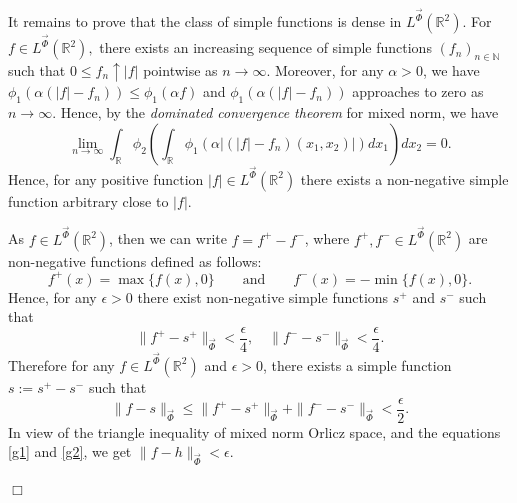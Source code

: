 \documentclass[11pt, a4paper]{article}
\theoremstyle{definition}
\newcommand{\qedwhite}{\hfill \ensuremath{\Box}}
\renewenvironment{proof}{{\raggedright \bfseries Proof.}}{\qedwhite}
\numberwithin{equation}{section}
\def\NN{\mathbb N}
\def\RR{\mathbb R}
\newcommand{\dlp}[1]{{\color{red}{[DP: #1]}}}
\newcommand{\vc}[1]{\overrightarrow{#1}}
\begin{document}
\begin{proof}
    
 It remains to prove that the class of simple functions is dense in $L^{\overrightarrow{\Phi}}(\mathbb{R}^2)$. For $f\in L^{\overrightarrow{\Phi}}(\RR^2),$ there exists an increasing sequence of simple functions $(f_n)_{n \in \NN}$   such that $0\leq f_n \uparrow |f|$ pointwise  as $n \rightarrow \infty$.  Moreover, for any $\alpha>0$, we have $\phi_1(\alpha(|f|-f_n))\leq \phi_1(\alpha f)$ and $\phi_1(\alpha(|f|-f_n))$ approaches to zero as $n \rightarrow \infty.$ Hence, by the \emph{dominated convergence theorem} for mixed norm, we have
 $$ \lim_{n\to \infty} \int _{\RR}\phi_2\left(\int_{\RR}\phi_1\left( \alpha|(|f|-f_n)(x_1,x_2)| \right)dx_1\right)dx_2 = 0.$$ Hence, for any positive function $|f|\in L^{\vc{\Phi}}(\RR^2)$ there exists a non-negative simple function arbitrary close to $|f|$.
\par 
As $f\in L^{\vc{\Phi}}(\RR^2)$, then we can write \( f = f^+ - f^- \), where \( f^+, f^- \in L^{\overrightarrow{\Phi}}(\mathbb{R}^2) \) are non-negative functions defined as follows:
\begin{equation*}
    f^+(x)=\max\{f(x), 0\} \qquad \text{and} \qquad f^-(x)=-\min\{f(x), 0\}.
\end{equation*}
Hence, for any \( \epsilon > 0 \) there exist non-negative simple functions $s^+$ and $s^-$ such that
\[
\|f^+ - s^+\|_{\overrightarrow{\Phi}} < \frac{\epsilon}{4}, \quad \|f^- - s^-\|_{\overrightarrow{\Phi}} < \frac{\epsilon}{4}.
\]
Therefore  for any $f\in L^{\overrightarrow{\Phi}}(\RR^2) $ and $\epsilon>0$, there exists a simple function \( s := s^+ - s^- \) such that
	\begin{equation}\label{g2}
		\|f - s\|_{\overrightarrow{\Phi}} \leq \|f^+ - s^+\|_{\overrightarrow{\Phi}} + \|f^- - s^-\|_{\overrightarrow{\Phi}} < \frac{\epsilon}{2}.
	\end{equation}
In view of the triangle inequality of mixed norm Orlicz space, and the equations \eqref{g1} and \eqref{g2}, we get $\|f-h\|_{\vc{\Phi}}  <\epsilon.$


\end{proof}
\end{document}
